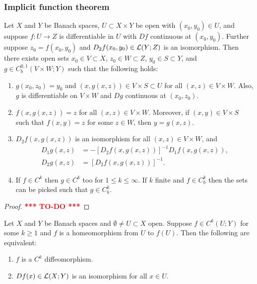 \documentclass[a4paper]{article}
\newcommand{\TODO}{\textcolor{red}{\textbf{*** TO-DO ***}}}
\begin{document}
\subsubsection{Implicit function theorem}

\begin{thm}
  Let $X$ and $Y$ be Banach spaces, $U \subset X \times Y$
  be open with $(x_0, y_0) \in U$, and suppose $f: U \to Z$
  is differentiable in $U$ with $Df$ continuous
  at $(x_0, y_0)$. Further suppose $z_0 = f(x_0, y_0)$
  and $D_2 f(x_0, y_0) \in \mathcal{L}(Y; Z)$ is an isomorphism.
  Then there exists open sets $x_0 \in V \subset X$,
  $z_0 \in W \subset Z$, $y_0 \in S \subset Y$, and
  $g \in C^{0,1}_b (V \times W ; Y)$ such that the following
  holds:
  \begin{enumerate}
    \item $g(x_0, z_0) = y_0$ and $(x, g(x, z)) \in V \times S
    \subset U$ for all $(x, z) \in V \times W$. Also, $g$
    is differentiable on $V \times W$ and $Dg$ continuous at
    $(x_0, z_0)$.

    \item $f(x, g(x, z)) = z$ for all $(x, z) \in V \times W$.
    Moreover, if $(x, y) \in V \times S$ such that
    $f(x, y) = z$ for some $z \in W$, then $y = g(x, z)$.

    \item $D_2 f(x, g(x, z))$ is an isomorphism for all
    $(x, z) \in V \times W$, and
    \[
    \begin{aligned}
      D_1 g(x, z) &= - \left[ D_2 f(x, g(x, z)) \right]^{-1}
      D_1 f (x, g(x, z)), \\
      D_2 g(x, z) &= \left[ D_2 f(x, g(x, z)) \right]^{-1}.
    \end{aligned}
    \]

    \item If $f \in C^k$ then $g \in C^k$ too for $1 \leq k
    \leq \infty$. If $k$ finite and $f \in C^k_b$ then the
    sets can be picked such that $g \in C^k_b$.
  \end{enumerate}
\end{thm}

\begin{proof}
  \TODO
\end{proof}


\begin{thm}
Let $X$ and $Y$ be Banach spaces and $\emptyset \neq U \subset X$
open.  Suppose $f \in C^k(U; Y)$ for some $k \geq 1$ and
$f$ is a homeomorphism from $U$ to $f(U)$. Then the following
are equivalent:
\begin{enumerate}
\item $f$ is a $C^k$ diffeomorphism.
\item $Df(x) \in \mathcal{L}(X; Y)$ is an isomorphism for all $x \in U$.
\end{enumerate}
\end{thm}
\end{document}
